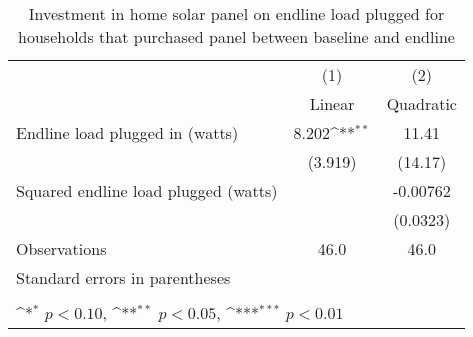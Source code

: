 \begin{table}[htbp]\centering
\def\sym#1{\ifmmode^{#1}\else\(^{#1}\)\fi}
\caption{Investment in home solar panel on endline load plugged for households that purchased panel between baseline and endline \label{tab: LABEL}}
\begin{tabular*}{1.0\hsize}{@{\hskip\tabcolsep\extracolsep\fill}l*{2}{c}}
\toprule
                                &\multicolumn{1}{c}{(1)}&\multicolumn{1}{c}{(2)}\\
                                &\multicolumn{1}{c}{Linear}&\multicolumn{1}{c}{Quadratic}\\
\midrule
Endline load plugged in (watts) &       8.202\sym{**} &       11.41         \\
                                &     (3.919)         &     (14.17)         \\
\addlinespace
Squared endline load plugged (watts)&                     &    -0.00762         \\
                                &                     &    (0.0323)         \\
\midrule
Observations                    &        46.0         &        46.0         \\
\bottomrule
\multicolumn{3}{l}{\footnotesize Standard errors in parentheses}\\
\multicolumn{3}{l}{\footnotesize }\\
\multicolumn{3}{l}{\footnotesize \sym{*} \(p<0.10\), \sym{**} \(p<0.05\), \sym{***} \(p<0.01\)}\\
\end{tabular*}
\end{table}

